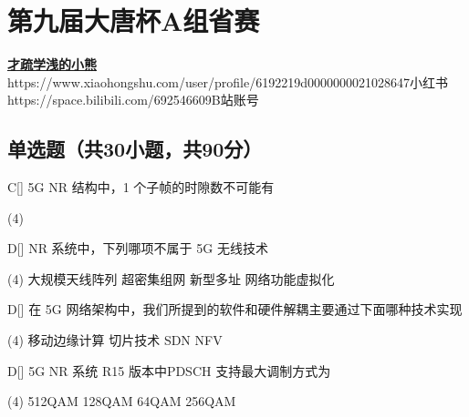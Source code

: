 \chapter{第九届大唐杯A组省赛}
\fancyhead[R]{\color{H6}\kaishu\rightmark\,}

\date{2022年4月10日}{}{\href{https://github.com/xubenshan/dtcup}{\textbf{才疏学浅的小熊}}}
{}
{https://www.xiaohongshu.com/user/profile/6192219d0000000021028647}{小红书}
{https://space.bilibili.com/692546609}{B站账号}




\section{单选题（共30小题，共90分）}



\begin{choice}{C}[]
    5G NR 结构中，1 个子帧的时隙数不可能有
    \begin{tasks}(4)
    \end{tasks}
\end{choice}


\begin{choice}{D}[]
    NR 系统中，下列哪项不属于 5G 无线技术
    \begin{tasks}(4)
        \task 大规模天线阵列
        \task 超密集组网
        \task 新型多址
        \task 网络功能虚拟化
    \end{tasks}
\end{choice}




\begin{choice}{D}[]
    在 5G 网络架构中，我们所提到的软件和硬件解耦主要通过下面哪种技术实现
    \begin{tasks}(4)
        \task 移动边缘计算
        \task 切片技术
        \task SDN
        \task NFV
    \end{tasks}
\end{choice}




\begin{choice}{D}[]
    5G NR 系统 R15 版本中PDSCH 支持最大调制方式为
    \begin{tasks}(4)
        \task 512QAM
        \task 128QAM
        \task 64QAM
        \task 256QAM
    \end{tasks}
\end{choice}


